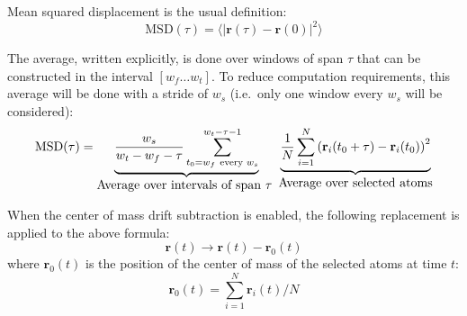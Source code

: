 \documentclass{article}
\begin{document}
\thispagestyle{empty}
\pagestyle{empty}  

Mean squared displacement is the usual definition:
%
$$\mbox{MSD}(\tau)= \langle | \mathbf r (\tau) - \mathbf r(0) |^2 \rangle $$

The average, written explicitly, is done over windows of span $\tau$
that can be constructed in the interval $[w_f \dots w_t]$. To reduce
computation requirements, this average will be done with a stride of $w_s$ (i.e.\
only one window every $w_s$ will be considered):
%
$$\mbox{MSD}(\tau)= \underbrace{ 
  \frac{w_s}{w_t-w_f-\tau} 
  \sum_{t_0=w_f \mbox{ \scriptsize every } w_s}^{w_t-\tau-1}
 }_{\mbox{Average over intervals of span $\tau$ }}  
 \underbrace{ 
   \frac{1}{N}
   \sum_{i=1}^N
   \left(
     \mathbf r_i(t_0+\tau) - \mathbf r_i(t_0) 
   \right)^2
 }_{\mbox{Average over selected atoms}}
$$

When the center of mass drift subtraction is enabled, the following
replacement is applied to the above formula:
%
$$\mathbf r(t) \to \mathbf r(t)-\mathbf r_0(t)$$
%
where $\mathbf r_0(t)$ is the position of the center
of mass of the selected atoms at time $t$:
%
$$\mathbf r_0(t)=\sum_{i=1}^N \mathbf r_i(t) /N$$
\end{document}
